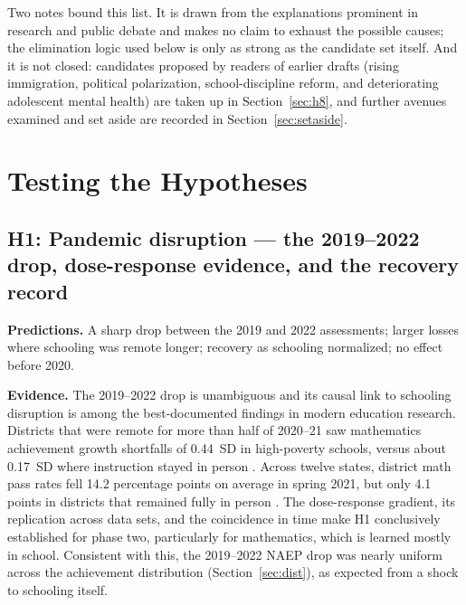 \documentclass[11pt]{article}
\begin{document}
Two notes bound this list. It is drawn from the explanations prominent in research and public debate and makes no claim to exhaust the possible causes; the elimination logic used below is only as strong as the candidate set itself. And it is not closed: candidates proposed by readers of earlier drafts (rising immigration, political polarization, school-discipline reform, and deteriorating adolescent mental health) are taken up in Section~\ref{sec:h8}, and further avenues examined and set aside are recorded in Section~\ref{sec:setaside}.

\section{Testing the Hypotheses}\label{sec:testing}

\subsection{H1: Pandemic disruption --- the 2019--2022 drop, dose-response evidence, and the recovery record}
\label{sec:h1}

\textbf{Predictions.} A sharp drop between the 2019 and 2022 assessments; larger losses where schooling was remote longer; recovery as schooling normalized; no effect before 2020.

\textbf{Evidence.} The 2019--2022 drop is unambiguous and its causal link to schooling disruption is among the best-documented findings in modern education research. Districts that were remote for more than half of 2020--21 saw mathematics achievement growth shortfalls of 0.44~SD in high-poverty schools, versus about 0.17~SD where instruction stayed in person \citep{goldhaber2023}. Across twelve states, district math pass rates fell 14.2 percentage points on average in spring 2021, but only 4.1 points in districts that remained fully in person \citep{jack2023}. The dose-response gradient, its replication across data sets, and the coincidence in time make H1 conclusively established for phase two, particularly for mathematics, which is learned mostly in school. Consistent with this, the 2019--2022 NAEP drop was nearly uniform across the achievement distribution (Section~\ref{sec:dist}), as expected from a shock to schooling itself.
\end{document}
